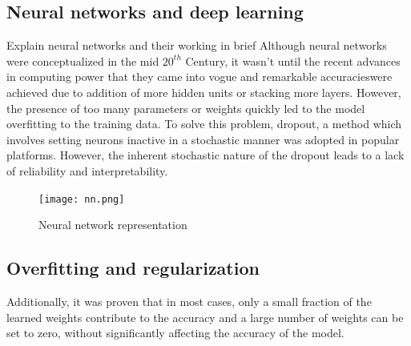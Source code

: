 \documentclass[a4paper,12pt]{article}
\begin{document}
\subsection{Neural networks and deep learning}
Explain neural networks and their working in brief
Although neural networks were conceptualized in the mid $20^{th}$ Century, it wasn't until the recent advances in computing power that they came into vogue and remarkable accuracies\cite{lecun2015deep}were achieved due to addition of more hidden units or stacking more layers. However, the presence of too many parameters or weights quickly led to the model overfitting to the training data. To solve this problem, dropout\cite{srivastava2014dropout}, a method which involves setting neurons inactive in a stochastic manner was adopted in popular platforms. However, the inherent stochastic nature of the dropout leads to a lack of reliability and interpretability. 
\begin{figure}[H]
 \centering
 \texttt{[image: nn.png]}
 \caption{Neural network representation}
  \label{fig:ALAMO Flowchart}
\end{figure}

\subsection{Overfitting and regularization}
Additionally, it was proven \cite{denil2013predicting} that in most cases, only a small fraction of the learned weights contribute to the accuracy and a large number of weights can be set to zero, without significantly affecting the accuracy of the model.
\end{document}
